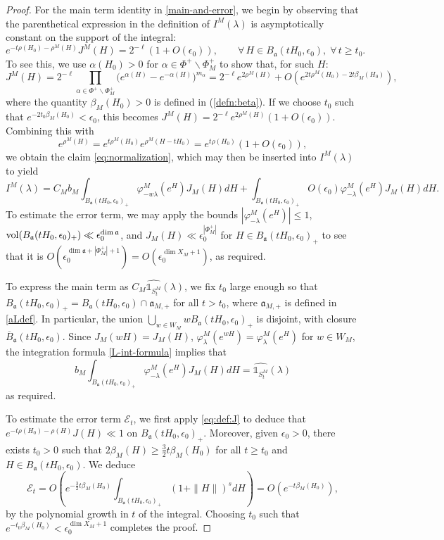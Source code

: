 \documentclass[12pt]{amsart}
\theoremstyle{remark}
\newcommand{\ga}{\mathfrak a}
\begin{document}
\begin{proof}
    
For the main term identity in \eqref{main-and-error}, we begin by observing that the parenthetical expression in the definition of $I^M(\lambda)$ is asymptotically constant on the support of the integral:
\begin{equation}\label{eq:normalization}
e^{-t \rho(H_0)-\rho^M(H)}J^M(H)=2^{-\ell}(1+O(\epsilon_0)),\qquad \forall\, H \in B_\ga(tH_0,\epsilon_0),\;\forall\, t \ge t_0.
\end{equation}
To see this, we use $\alpha(H_0) > 0$ for $\alpha \in \Phi^+ \smallsetminus \Phi_M^+$ to show that, for such $H$:
\[
J^M(H) =2^{-\ell}\prod_{\alpha \in \Phi^+ \smallsetminus \Phi_M^+} \big(e^{\alpha(H)} - e^{-\alpha(H)}\big)^{m_\alpha} = 2^{-\ell}e^{2 \rho^M(H)} +  O(e^{2t \rho^M(H_0) - 2t \beta_M(H_0) }),
\]
where the quantity $\beta_M(H_0) > 0$ is defined in (\ref{defn:beta}).  If we choose $t_0$ such that $e^{ -2t_0 \beta_M(H_0)} < \epsilon_0$, this becomes $J^M(H) = 2^{-\ell} e^{2 \rho^M(H)} (1+O(\epsilon_0))$.  Combining this with
\[
e^{\rho^M(H)}=e^{t\rho^M(H_0)}e^{\rho^M(H-tH_0)}=e^{t\rho(H_0)}(1+O(\epsilon_0)),
\]
we obtain the claim \eqref{eq:normalization}, which may then be inserted into $I^M(\lambda)$ to yield
\[
I^M(\lambda) = C_M b_M \int_{B_\ga(t H_0,\epsilon_0)_+} \varphi_{-w\lambda}^M(e^H) J_M(H)dH + \int_{B_\ga(t H_0,\epsilon_0)_+} O(\epsilon_0) \varphi_{-\lambda}^M(e^H) J_M(H)dH.
\]
To estimate the error term, we may apply the bounds $| \varphi_{-\lambda}^M(e^H) | \le 1$, ${\rm vol}(B_\ga(t H_0,\epsilon_0)_+) \ll \epsilon_0^{\dim \ga}$, and $J_M(H) \ll \epsilon_0^{ | \Phi^+_M |}$ for $H \in B_\ga(t H_0,\epsilon_0)_+$ to see that it is $O( \epsilon_0^{ \dim \ga + | \Phi^+_M | + 1}) = O(\epsilon_0^{ \dim X_M + 1})$, as required.

To express the main term as $C_M\widehat{\mathds{1}_{S_t^M}}(\lambda)$, we fix $t_0$ large enough so that $B_\ga(tH_0,\epsilon_0)_+ = B_\ga(tH_0,\epsilon_0) \cap \ga_{M,+}$ for all $t > t_0$, where $\ga_{M,+}$ is defined in \eqref{aLdef}. In particular, the union $\bigcup_{w\in W_M}wB_\ga(t H_0,\epsilon_0)_+$ is disjoint, with closure $\overline{B}_\ga(t H_0,\epsilon_0)$. Since $J_M(wH)=J_M(H)$, $\varphi_{\lambda}^M(e^{wH}) = \varphi_{\lambda}^M(e^{H})$ for $w \in W_M$, the integration formula \eqref{L-int-formula} implies that
\[
b_M \int_{B_\ga(tH_0,\epsilon_0)_+}\varphi_{-\lambda}^M(e^H) J_M(H)dH = \widehat{\mathds{1}_{S_t^M}}(\lambda)
\]
as required.

To estimate the error term $\mathcal{E}_t$, we first apply \eqref{eq:def:J} to deduce that $e^{-t\rho(H_0)-\rho(H)}J(H)\ll 1$ on $B_\ga(tH_0,\epsilon_0)_+$. Moreover, given $\epsilon_0>0$, there exists $t_0>0$ such that $2\beta_M(H) \geq \tfrac{3}{2} t \beta_M(H_0)$ for all $t\geq t_0$ and $H\in B_\ga(tH_0,\epsilon_0)$. We deduce 
\[
\mathcal{E}_t= O\left(e^{-\tfrac{3}{2} t \beta_M(H_0)}\int_{B_\ga(tH_0,\epsilon_0)_+}(1+\|H\|)^sdH\right)=O(e^{-t \beta_M(H_0)}),
\]
by the polynomial growth in $t$ of the integral.  Choosing $t_0$ such that $e^{ -t_0 \beta_M(H_0)} < \epsilon_0^{\dim X_M + 1}$ completes the proof.\end{proof}
\end{document}
